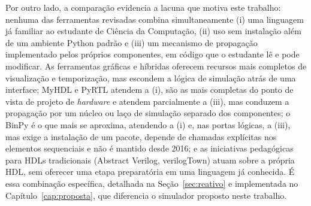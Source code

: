 Por outro lado, a comparação evidencia a lacuna que motiva este trabalho: nenhuma das ferramentas revisadas combina simultaneamente (i) uma linguagem já familiar ao estudante de Ciência da Computação, (ii) uso sem instalação além de um ambiente Python padrão e (iii) um mecanismo de propagação implementado pelos próprios componentes, em código que o estudante lê e pode modificar. As ferramentas gráficas e híbridas oferecem recursos mais completos de visualização e temporização, mas escondem a lógica de simulação atrás de uma interface; MyHDL e PyRTL atendem a (i), são as mais completas do ponto de vista de projeto de \textit{hardware} e atendem parcialmente a (iii), mas conduzem a propagação por um núcleo ou laço de simulação separado dos componentes; o BinPy é o que mais se aproxima, atendendo a (i) e, nas portas lógicas, a (iii), mas exige a instalação de um pacote, depende de chamadas explícitas nos elementos sequenciais e não é mantido desde 2016; e as iniciativas pedagógicas para HDLs tradicionais (Abstract Verilog, verilogTown) atuam sobre a própria HDL, sem oferecer uma etapa preparatória em uma linguagem já conhecida. É essa combinação específica, detalhada na Seção~\ref{sec:reativo} e implementada no Capítulo~\ref{cap:proposta}, que diferencia o simulador proposto neste trabalho.
